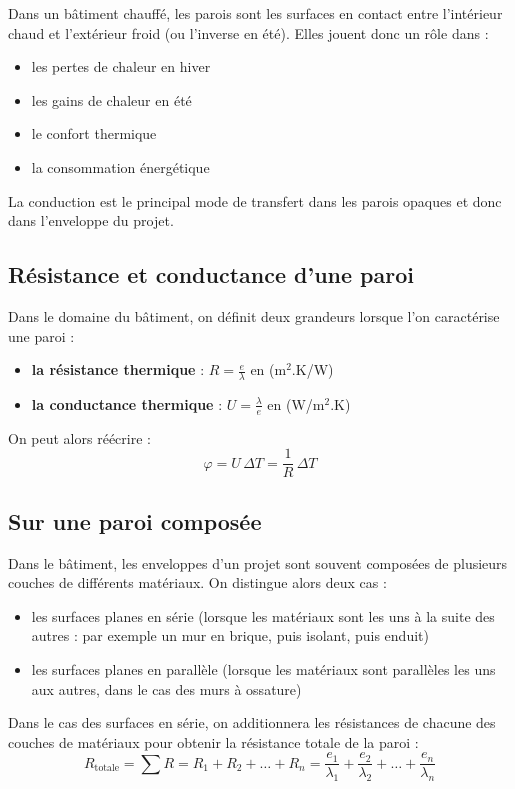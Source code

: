 Dans un bâtiment chauffé, les parois sont les surfaces en contact entre l'intérieur chaud et l'extérieur froid (ou l'inverse en été).
Elles jouent donc un rôle dans :
\begin{itemize}
  \item les pertes de chaleur en hiver
  \item les gains de chaleur en été
  \item le confort thermique
  \item la consommation énergétique
\end{itemize}
La conduction est le principal mode de transfert dans les parois opaques et donc dans l'enveloppe du projet.

\subsection*{Résistance et conductance d'une paroi}
Dans le domaine du bâtiment, on définit deux grandeurs lorsque l'on caractérise une paroi :
\begin{itemize}
  \item \textbf{la résistance thermique} : $\displaystyle R = \frac{e}{\lambda}$ \quad en (m$^2$.K/W)
  \item \textbf{la conductance thermique} : $\displaystyle U = \frac{\lambda}{e}$ \quad en (W/m$^2$.K)
\end{itemize}
On peut alors réécrire :
\begin{equation}
  \varphi = U\,\Delta T = \frac{1}{R}\,\Delta T
\end{equation}


\subsection*{Sur une paroi composée}
Dans le bâtiment, les enveloppes d'un projet sont souvent composées de plusieurs couches de différents matériaux.
On distingue alors deux cas :

\begin{itemize}
  \item les surfaces planes en série (lorsque les matériaux sont les uns à la suite des autres : par exemple un mur en brique, puis isolant, puis enduit)
  \item les surfaces planes en parallèle (lorsque les matériaux sont parallèles les uns aux autres, dans le cas des murs à ossature)
\end{itemize}


Dans le cas des surfaces en série, on additionnera les résistances de chacune des couches de matériaux pour obtenir la résistance totale de la paroi :
\begin{equation}
  R_{\mathrm{totale}} = \sum R = R_1 + R_2 + \dots + R_n
  = \frac{e_1}{\lambda_1} + \frac{e_2}{\lambda_2} + \dots + \frac{e_n}{\lambda_n}
\end{equation}

